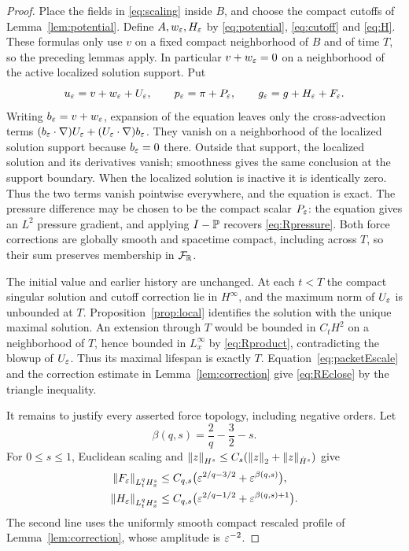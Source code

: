 \begin{proof}
Place the fields in \eqref{eq:scaling} inside $B$, and choose the compact cutoffs of Lemma~\ref{lem:potential}. Define $A,w_\varepsilon,H_\varepsilon$ by \eqref{eq:potential}, \eqref{eq:cutoff} and \eqref{eq:H}. These formulas only use $v$ on a fixed compact neighborhood of $B$ and of time $T$, so the preceding lemmas apply. In particular $v+w_\varepsilon=0$ on a neighborhood of the active localized solution support. Put
\[
 u_\varepsilon=v+w_\varepsilon+U_\varepsilon,\qquad
 p_\varepsilon=\pi+P_\varepsilon,\qquad
 g_\varepsilon=g+H_\varepsilon+F_\varepsilon.
\]
Writing $b_\varepsilon=v+w_\varepsilon$, expansion of the equation leaves only the cross-advection terms $(b_\varepsilon\cdot\nabla)U_\varepsilon+(U_\varepsilon\cdot\nabla)b_\varepsilon$. They vanish on a neighborhood of the localized solution support because $b_\varepsilon=0$ there. Outside that support, the localized solution and its derivatives vanish; smoothness gives the same conclusion at the support boundary. When the localized solution is inactive it is identically zero. Thus the two terms vanish pointwise everywhere, and the equation is exact. The pressure difference may be chosen to be the compact scalar $P_\varepsilon$: the equation gives an $L^2$ pressure gradient, and applying $I-\mathbb P$ recovers \eqref{eq:Rpressure}. Both force corrections are globally smooth and spacetime compact, including across $T$, so their sum preserves membership in $\mathcal F_{\mathbb R}$.

The initial value and earlier history are unchanged. At each $t<T$ the compact singular solution and cutoff correction lie in $H^\infty$, and the maximum norm of $U_\varepsilon$ is unbounded at $T$. Proposition~\ref{prop:local} identifies the solution with the unique maximal solution. An extension through $T$ would be bounded in $C_tH^2$ on a neighborhood of $T$, hence bounded in $L^\infty_x$ by \eqref{eq:Rproduct}, contradicting the blowup of $U_\varepsilon$. Thus its maximal lifespan is exactly $T$. Equation~\eqref{eq:packetEscale} and the correction estimate in Lemma~\ref{lem:correction} give \eqref{eq:REclose} by the triangle inequality.

It remains to justify every asserted force topology, including negative orders. Let
\[
 \beta(q,s)=\frac2q-\frac32-s.
\]
For $0\le s\le1$, Euclidean scaling and
$\left\lVert z\right\rVert_{H^s}\le C_s(\left\lVert z\right\rVert_2+\left\lVert z\right\rVert_{\dot H^s})$ give
\begin{align}
 \left\lVert F_\varepsilon\right\rVert_{L^q_tH^s_x}
 &\le C_{q,s}\bigl(\varepsilon^{2/q-3/2}+\varepsilon^{\beta(q,s)}\bigr),\nonumber\\
 \left\lVert H_\varepsilon\right\rVert_{L^q_tH^s_x}
 &\le C_{q,s}\bigl(\varepsilon^{2/q-1/2}+\varepsilon^{\beta(q,s)+1}\bigr).
 \label{eq:RpositiveScale}
\end{align}
The second line uses the uniformly smooth compact rescaled profile of Lemma~\ref{lem:correction}, whose amplitude is $\varepsilon^{-2}$.


\end{proof}

